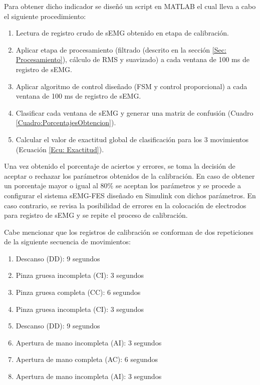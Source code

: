 Para obtener dicho indicador se diseñó un script en MATLAB \textregistered \; el cual lleva a cabo el siguiente procedimiento:

\begin{enumerate}
	\item Lectura de registro crudo de sEMG obtenido en etapa de calibración.
	\item Aplicar etapa de procesamiento (filtrado (descrito en la sección \ref{Sec: Procesamiento}), cálculo de RMS y suavizado) a cada ventana de 100 ms de registro de sEMG.
	\item Aplicar algoritmo de control diseñado (FSM y control proporcional) a cada ventana de 100 ms de registro de sEMG.
	\item Clasificar cada ventana de sEMG y generar una matriz de confusión (Cuadro \ref{Cuadro:PorcentajesObtencion}).
	\item Calcular el valor de exactitud global de clasificación para los 3 movimientos (Ecuación \ref{Ecu: Exactitud}).
\end{enumerate}

Una vez obtenido el porcentaje de aciertos y errores, se toma la decisión de aceptar o rechazar los parámetros obtenidos de la calibración. En caso de obtener un porcentaje mayor o igual al 80\% se aceptan los parámetros y se procede a configurar el sistema sEMG-FES diseñado en Simulink \textregistered \; con dichos parámetros. En caso contrario, se revisa la posibilidad de errores en la colocación de electrodos para registro de sEMG y se repite el proceso de calibración.

Cabe mencionar que los registros de calibración se conforman de dos repeticiones de la siguiente secuencia de movimientos:

\begin{enumerate}
	\item Descanso (DD): 9 segundos
	\item Pinza gruesa incompleta (CI): 3 segundos
	\item Pinza gruesa completa (CC): 6 segundos
	\item Pinza gruesa incompleta (CI): 3 segundos
	\item Descanso (DD): 9 segundos
	\item Apertura de mano incompleta (AI): 3 segundos
	\item Apertura de mano completa (AC): 6 segundos
	\item Apertura de mano incompleta (AI): 3 segundos
\end{enumerate}

